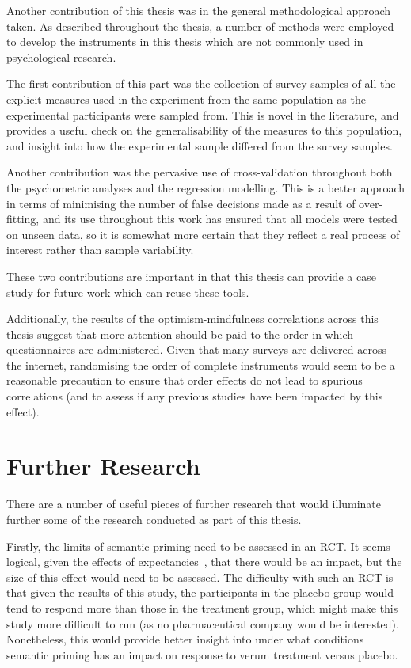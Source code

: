 Another contribution of this thesis was in the general methodological approach taken. 
As described throughout the thesis, a number of methods were employed to develop the instruments 
in this thesis which are not commonly used in psychological research.

The first contribution of this part was the collection of survey samples of all the explicit
measures used in the experiment from the same population as the experimental participants were sampled from. This is novel in the literature, and provides a useful check on the generalisability of the measures to this population, and insight into how the experimental sample differed from the survey samples. 

Another contribution was the pervasive use of cross-validation throughout both the psychometric analyses and the regression modelling. This is a better approach in terms of minimising the number of false decisions made as a result of over-fitting, and its use throughout this work has ensured that all models were tested on unseen data, so it is somewhat more certain that they reflect a real process of interest rather than sample variability. 

These two contributions are important in that this thesis can provide a case study for future work which can reuse these tools. 

Additionally, the results of the optimism-mindfulness correlations across this thesis suggest that more attention should be paid to the order in which questionnaires are administered. Given that many surveys are delivered across the internet, randomising the order of complete instruments would seem to be a reasonable precaution to ensure that order effects do not lead to spurious correlations (and to assess if any previous studies have been impacted by this effect). 

\section{Further Research}
\label{sec:further-research}

There are a number of useful pieces of further research that would illuminate further some of the research conducted as part of this thesis. 

Firstly, the limits of semantic priming need to be assessed in an RCT. It seems logical, given the effects of expectancies~\cite{Bausell2005}, that there would be an impact, but the size of this effect would need to be assessed. The difficulty with such an RCT is that given the results of this study, the participants in the placebo group would tend to respond more than those in the treatment group, which might make this study more difficult to run (as no pharmaceutical company would be interested). Nonetheless, this would provide better insight into under what conditions semantic priming has an impact on response to verum treatment versus placebo. 

